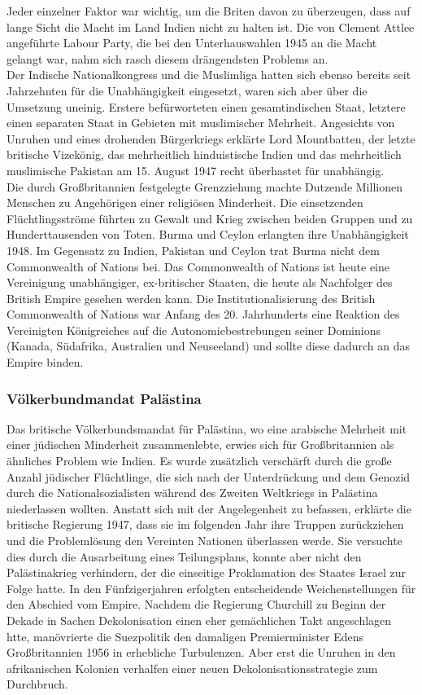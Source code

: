 \documentclass[letterpaper, 12pt]{article}
\let\tempsubsubsection\subsubsection
\renewcommand\subsubsection[1]{\vspace{0cm}\tempsubsubsection{#1}\vspace{0cm}}
\begin{document}
Jeder einzelner Faktor war wichtig, um die Briten davon zu überzeugen, dass auf lange Sicht die Macht im Land Indien nicht zu halten ist. Die von Clement Attlee angeführte Labour Party, die bei den Unterhauswahlen 1945 an die Macht gelangt war, nahm sich rasch diesem drängendsten Problems an. \\
Der Indische Nationalkongress und die Muslimliga hatten sich ebenso bereits seit Jahrzehnten für die Unabhängigkeit eingesetzt, waren sich aber über die Umsetzung uneinig. Erstere befürworteten einen gesamtindischen Staat, letztere einen separaten Staat in Gebieten mit muslimischer Mehrheit. Angesichts von Unruhen und eines drohenden Bürgerkriegs erklärte Lord Mountbatten, der letzte britische Vizekönig, das mehrheitlich hinduistische Indien und das mehrheitlich muslimische Pakistan am 15. August 1947 recht überhastet für unabhängig. \\
Die durch Großbritannien festgelegte Grenzziehung machte Dutzende Millionen Menschen zu Angehörigen einer religiösen Minderheit. Die einsetzenden Flüchtlingsströme führten zu Gewalt und Krieg zwischen beiden Gruppen und zu Hunderttausenden von Toten. Burma und Ceylon erlangten ihre Unabhängigkeit 1948. Im Gegensatz zu Indien, Pakistan und Ceylon trat Burma nicht dem Commonwealth of Nations bei. Das Commonwealth of Nations ist heute eine Vereinigung unabhängiger, ex-britischer Staaten, die heute als Nachfolger des British Empire gesehen werden kann. Die Institutionalisierung des British Commonwealth of Nations war Anfang des 20. Jahrhunderts eine Reaktion des Vereinigten Königreiches auf die Autonomiebestrebungen seiner Dominions (Kanada, Südafrika, Australien und Neuseeland) und sollte diese dadurch an das Empire binden.

\subsubsection{Völkerbundmandat Palästina}

Das britische Völkerbundsmandat für Palästina, wo eine arabische Mehrheit mit einer jüdischen Minderheit zusammenlebte, erwies sich für Großbritannien als ähnliches Problem wie Indien. Es wurde zusätzlich verschärft durch die große Anzahl jüdischer Flüchtlinge, die sich nach der Unterdrückung und dem Genozid durch die Nationalsozialisten während des Zweiten Weltkriegs in Palästina niederlassen wollten. Anstatt sich mit der Angelegenheit zu befassen, erklärte die britische Regierung 1947, dass sie im folgenden Jahr ihre Truppen zurückziehen und die Problemlösung den Vereinten Nationen überlassen werde. Sie versuchte dies durch die Ausarbeitung eines Teilungsplans, konnte aber nicht den Palästinakrieg verhindern, der die einseitige Proklamation des Staates Israel zur Folge hatte. \clearpage
In den Fünfzigerjahren erfolgten entscheidende Weichenstellungen für den Abschied vom Empire. Nachdem die Regierung Churchill zu Beginn der Dekade in Sachen Dekolonisation einen eher gemächlichen Takt angeschlagen htte, manövrierte die Suezpolitik den damaligen Premierminister Edens Großbritannien 1956 in erhebliche Turbulenzen. Aber erst die Unruhen in den afrikanischen Kolonien verhalfen einer neuen Dekolonisationsstrategie zum Durchbruch. \\
\end{document}
